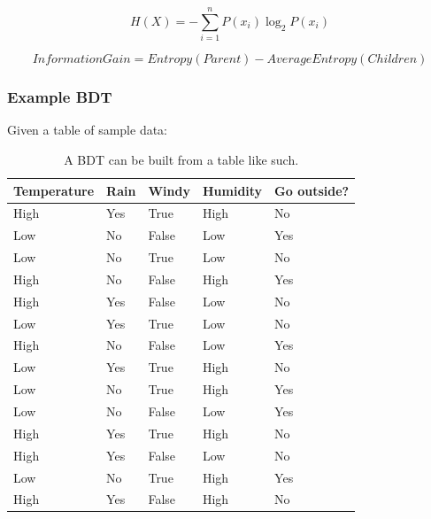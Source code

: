 \documentclass[
12pt,
headsepline,
bibliography=totoc,
twoside=semi,
fleqn
]{scrartcl}
\begin{document}
\begin{centering}
   \begin{equation}\label{fig:fig3}
      H(X)= - \sum_{i=1}^{n}P(x_i)\log_2{P(x_i)}
   \end{equation}  
\end{centering}
 
\begin{centering}
   \begin{equation}\label{fig:fig4}
      Information Gain = Entropy(Parent) - Average Entropy(Children)
   \end{equation}  
\end{centering}


 \subsubsection{Example BDT\label{sec:sec2-1-3}}
 Given a table of sample data: \\
 
 
 \begin{table}[]
   \begin{tabular}{|l|l|l|l||l|}
      \hline
      Temperature & Rain & Windy & Humidity & Go outside? \\
    \hline
    \hline
    High & Yes & True & High & No \\
    \hline
    Low& No & False & Low & Yes \\
    \hline
    Low& No & True & Low & No \\
    \hline
    High& No & False &  High& Yes \\
    \hline
    High&  Yes& False & Low & No \\
    \hline
    Low& Yes & True & Low & No \\
    \hline
    High& No &  False&  Low& Yes \\
    \hline
    Low&  Yes& True & High & No \\
    \hline
    Low&  No& True & High &  Yes\\
    \hline
    Low&  No&  False& Low & Yes \\
    \hline
    High&  Yes& True & High &  No\\
    \hline
    High&  Yes&  False& Low & No \\
    Low&  No& True& High & Yes\\
    \hline
    High& Yes & False & High & No\\
    \hline
   \end{tabular}
   \label{fig:fig5}
   \caption{A BDT can be built from a table like such.}
   \end{table}
\end{document}
